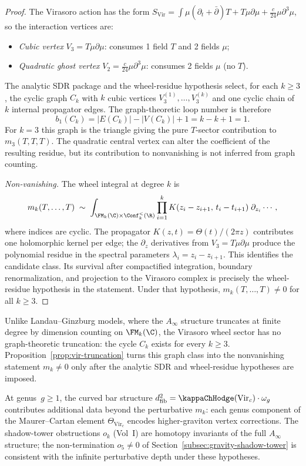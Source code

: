 \begin{proof}
The Virasoro action has the form $S_{\mathrm{Vir}} = \int \mu(\partial_t + \bar\partial) T + T\mu\partial\mu + \tfrac{c}{24}\mu\partial^3\mu$, so the interaction vertices are:
\begin{itemize}
\item \emph{Cubic vertex} $V_3 = T\mu\partial\mu$: consumes 1 field $T$ and 2 fields $\mu$;
\item \emph{Quadratic ghost vertex} $V_2 = \tfrac{c}{24}\mu\partial^3\mu$: consumes 2 fields $\mu$ (no $T$).
\end{itemize}

The analytic SDR package and the wheel-residue hypothesis select, for
each $k\ge3$, the cyclic graph $C_k$ with $k$ cubic vertices
$V_3^{(1)},\ldots,V_3^{(k)}$ and one cyclic chain of $k$ internal
propagator edges. The graph-theoretic loop number is therefore
\[
b_1(C_k)=|E(C_k)|-|V(C_k)|+1=k-k+1=1.
\]
For $k=3$ this graph is the triangle giving the pure $T$-sector
contribution to $m_3(T,T,T)$. The quadratic central vertex can alter
the coefficient of the resulting residue, but its contribution to
nonvanishing is not inferred from graph counting.

\emph{Non-vanishing.} The wheel integral at degree $k$ is
\[
m_k(T, \ldots, T) \;\sim\; \int_{\FM_k(\C) \times \Conf_k^{<}(\R)}
 \prod_{i=1}^k K(z_i - z_{i+1},\, t_i - t_{i+1})\; \partial_{z_i}\cdots,
\]
where indices are cyclic. The propagator $K(z,t) = \Theta(t)/(2\pi z)$
contributes one holomorphic kernel per edge; the
$\partial_z$ derivatives from $V_3 = T\mu\partial\mu$ produce the
polynomial residue in the spectral parameters
$\lambda_i = z_i - z_{i+1}$. This identifies the candidate class. Its
survival after compactified integration, boundary renormalization, and
projection to the Virasoro complex is precisely the wheel-residue
hypothesis in the statement. Under that hypothesis,
$m_k(T,\ldots,T)\ne0$ for all $k\ge3$.
\end{proof}

\begin{remark}
\label{rem:truncation-vs-depth}
Unlike Landau--Ginzburg models, where the $A_\infty$ structure
truncates at finite degree by dimension counting on $\FM_k(\C)$,
the Virasoro wheel sector has no graph-theoretic truncation: the
cycle $C_k$ exists for every $k\ge3$. Proposition~\ref{prop:vir-truncation}
turns this graph class into the nonvanishing statement
$m_k\ne0$ only after the analytic SDR and wheel-residue hypotheses are
imposed.

At genus~$g \ge 1$, the curved bar structure
$d^2_{\mathrm{fib}} = \kappaChHodge(\mathrm{Vir}_c) \cdot \omega_g$
contributes additional data beyond the perturbative $m_k$: each
genus component of the Maurer--Cartan element $\Theta_{\mathrm{Vir}_c}$
encodes higher-graviton vertex corrections. The shadow-tower
obstructions $o_k$ (Vol~I) are homotopy invariants of the full
$A_\infty$ structure; the non-termination $o_5 \ne 0$ of
Section~\ref{subsec:gravity-shadow-tower} is consistent with the
infinite perturbative depth under these hypotheses.
\end{remark}

